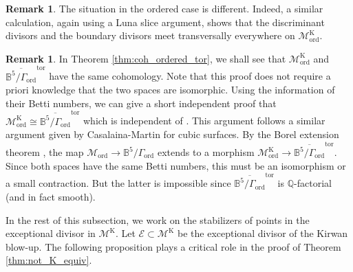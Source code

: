 \documentclass[12pt, pdftex]{amsart}
\theoremstyle{plain}
\theoremstyle{definition}
\newtheorem{rem}[thm]{Remark}
\numberwithin{equation}{section}
\def\Q{{\mathbb Q}}
\def\B{{\mathbb B}}
\def\ord{\mathrm{ord}}
\def\K{\mathrm{K}}
\def\tor{\mathrm{tor}}
\def\E{\mathscr{E}}
\def\M{\mathcal{M}}
\begin{document}
\begin{rem}\label{rem:orderediso}
The situation in the ordered case is different. Indeed, a similar calculation, again using a  Luna slice argument, shows that the 
discriminant divisors and the boundary divisors meet transversally everywhere on $\M^{\K}_{\ord}$.
\end{rem}
\begin{rem}\label{rem:isoordered}
In Theorem \ref{thm:coh_ordered_tor}, we shall see that $\M_{\ord}^{\K}$ and $\overline{\B^5/\Gamma_{\ord}}^{\tor}$ have the same cohomology. Note that this proof does not require a priori knowledge that the two spaces are isomorphic.
Using the information of their Betti numbers, we can give a short independent proof that $\M_{\ord}^{\K} \cong \overline{\B^5/\Gamma_{\ord}}^{\tor}$ which is independent of \cite{GKS21}. This argument follows a similar argument given by Casalaina-Martin for cubic surfaces. By the Borel extension theorem \cite[Theorem A]{Bo72}, the map $\M_{\ord} \to \B^5/\Gamma_{\ord}$ extends to a morphism $\M_{\ord}^{\K} \to \overline{\B^5/\Gamma_{\ord}}^{\tor}$. Since both spaces have 
the same Betti numbers, this must be an isomorphism or a small contraction. But the latter is impossible since $\overline{\B^5/\Gamma_{\ord}}^{\tor}$ is $\Q$-factorial (and in fact smooth). 
\end{rem}


In the rest of this subsection, we work on the stabilizers of points in the exceptional divisor in $\M^{\K}$.
Let $\E\subset\M^{\K}$ be the exceptional divisor of the Kirwan blow-up.
The following proposition plays a critical role in the proof of Theorem \ref{thm:not_K_equiv}.
\end{document}
